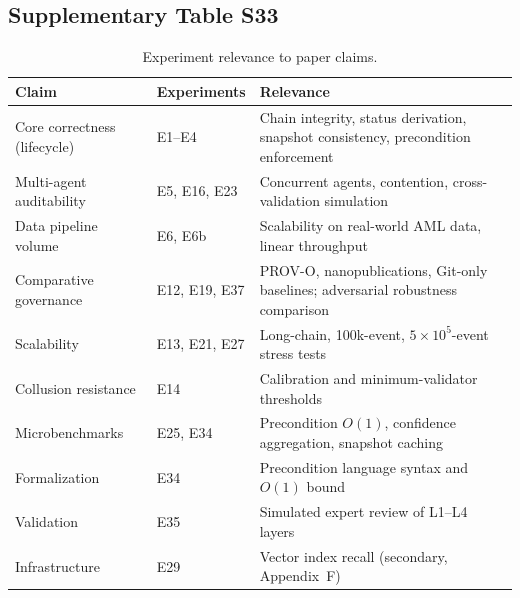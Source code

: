 \subsection{Supplementary Table S33}\label{tab:S33}
\begin{table}[htbp]
\centering
\footnotesize
\caption{Experiment relevance to paper claims.}
\label{tab:results-by-claim}
\begin{tabularx}{\textwidth}{@{}p{2.5cm}p{2.5cm}X@{}}
\toprule
\textbf{Claim} & \textbf{Experiments} & \textbf{Relevance} \\
\midrule
Core correctness (lifecycle) & E1--E4 & Chain integrity, status derivation, snapshot consistency, precondition enforcement \\
Multi-agent auditability & E5, E16, E23 & Concurrent agents, contention, cross-validation simulation \\
Data pipeline volume & E6, E6b & Scalability on real-world AML data, linear throughput \\
Comparative governance & E12, E19, E37 & PROV-O, nanopublications, Git-only baselines; adversarial robustness comparison \\
Scalability & E13, E21, E27 & Long-chain, 100k-event, $5\times10^5$-event stress tests \\
Collusion resistance & E14 & Calibration and minimum-validator thresholds \\
Microbenchmarks & E25, E34 & Precondition $O(1)$, confidence aggregation, snapshot caching \\
Formalization & E34 & Precondition language syntax and $O(1)$ bound \\
Validation & E35 & Simulated expert review of L1--L4 layers \\
Infrastructure & E29 & Vector index recall (secondary, Appendix~F) \\
\bottomrule
\end{tabularx}
\end{table}
